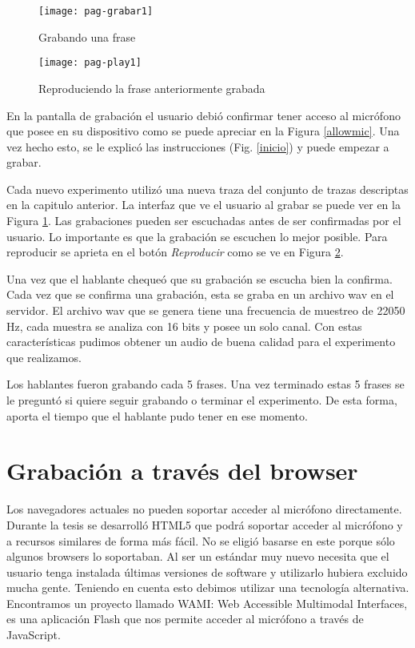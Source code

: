 \begin{figure}[h!]
    \centerline{\texttt{[image: pag-grabar1]} }
    \caption{Grabando una frase}
    \label{grabando}
\end{figure}

\begin{figure}[h!]
    \centerline{\texttt{[image: pag-play1]} }
    \caption{Reproduciendo la frase anteriormente grabada}
    \label{reproduciendo}
\end{figure}

En la pantalla de grabación el usuario debió confirmar tener acceso al micrófono que posee en su dispositivo como se puede apreciar en la Figura \ref{allowmic}. Una vez hecho esto, se le explicó las instrucciones (Fig. \ref{inicio}) y puede empezar a grabar. 

Cada nuevo experimento utilizó una nueva traza del conjunto de trazas descriptas en la capitulo anterior. La interfaz que ve el usuario al grabar se puede ver en la Figura \ref{grabando}. Las grabaciones pueden ser escuchadas antes de ser confirmadas por el usuario. Lo importante es que la grabación se escuchen lo mejor posible. Para reproducir se aprieta en el botón \textit{Reproducir} como se ve en Figura \ref{reproduciendo}. 

Una vez que el hablante chequeó que su grabación se escucha bien la confirma. Cada vez que se confirma una grabación, esta se graba en un archivo wav en el servidor. El archivo wav que se genera tiene una frecuencia de muestreo de 22050 Hz, cada muestra se analiza con 16 bits y posee un solo canal. Con estas características pudimos obtener un audio de buena calidad para el experimento que realizamos.

Los hablantes fueron grabando cada 5 frases. Una vez terminado estas 5 frases se le preguntó si quiere seguir grabando o terminar el experimento. De esta forma, aporta el tiempo que el hablante pudo tener en ese momento.


\section{Grabación a través del browser}

Los navegadores actuales no pueden soportar acceder al micrófono directamente. Durante la tesis se desarrolló HTML5 que podrá soportar acceder al micrófono y a recursos similares de forma más fácil. No se eligió basarse en este porque sólo algunos browsers lo soportaban. Al ser un estándar muy nuevo necesita que el usuario tenga instalada últimas versiones de software y utilizarlo hubiera excluido mucha gente. Teniendo en cuenta esto debimos utilizar una tecnología alternativa. Encontramos un proyecto llamado WAMI: Web Accessible Multimodal Interfaces, es una aplicación Flash que nos permite acceder al micrófono a través de JavaScript. 

